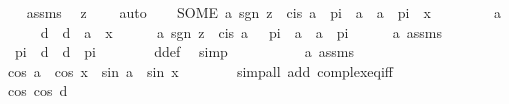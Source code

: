 \begin{isabellebody}
\ \ \isamarkupfalse%
\ assms\ \isamarkupfalse%
\ {\isachardoublequoteopen}z\ {\isasymnoteq}\ {}{\isachardoublequoteclose}\ \isamarkupfalse%
\ auto\isanewline
\ \ \isamarkupfalse%
\ {\isachardoublequoteopen}{\isacharparenleft}{\kern0pt}SOME\ a{\isachardot}{\kern0pt}\ sgn\ z\ {\isacharequal}{\kern0pt}\ cis\ a\ {\isasymand}\ {\isacharminus}{\kern0pt}pi\ {\isacharless}{\kern0pt}\ a\ {\isasymand}\ a\ {\isasymle}\ pi{\isacharparenright}{\kern0pt}\ {\isacharequal}{\kern0pt}\ x{\isachardoublequoteclose}\isanewline
\ \ \isamarkupfalse%
\isanewline
\ \ \ \ \isamarkupfalse%
\ a\isanewline
\ \ \ \ \isamarkupfalse%
\ d\ \ {\isachardoublequoteopen}d\ {\isacharequal}{\kern0pt}\ a\ {\isacharminus}{\kern0pt}\ x{\isachardoublequoteclose}\isanewline
\ \ \ \ \isamarkupfalse%
\ a{\isacharcolon}{\kern0pt}\ {\isachardoublequoteopen}sgn\ z\ {\isacharequal}{\kern0pt}\ cis\ a\ {\isasymand}\ {\isacharminus}{\kern0pt}\ pi\ {\isacharless}{\kern0pt}\ a\ {\isasymand}\ a\ {\isasymle}\ pi{\isachardoublequoteclose}\isanewline
\ \ \ \ \isamarkupfalse%
\ a\ assms\ \isamarkupfalse%
\ {\isachardoublequoteopen}{\isacharminus}{\kern0pt}\ {\isacharparenleft}{\kern0pt}{}{\isacharasterisk}{\kern0pt}pi{\isacharparenright}{\kern0pt}\ {\isacharless}{\kern0pt}\ d\ {\isasymand}\ d\ {\isacharless}{\kern0pt}\ {}{\isacharasterisk}{\kern0pt}pi{\isachardoublequoteclose}\isanewline
\ \ \ \ \ \ \isamarkupfalse%
\ d{\isacharunderscore}{\kern0pt}def\ \isamarkupfalse%
\ simp\isanewline
\ \ \ \ \isamarkupfalse%
\isanewline
\ \ \ \ \isamarkupfalse%
\ a\ assms\ \isamarkupfalse%
\ {\isachardoublequoteopen}cos\ a\ {\isacharequal}{\kern0pt}\ cos\ x{\isachardoublequoteclose}\ \ {\isachardoublequoteopen}sin\ a\ {\isacharequal}{\kern0pt}\ sin\ x{\isachardoublequoteclose}\isanewline
\ \ \ \ \ \ \isamarkupfalse%
\ {\isacharparenleft}{\kern0pt}simp{\isacharunderscore}{\kern0pt}all\ add{\isacharcolon}{\kern0pt}\ complex{\isacharunderscore}{\kern0pt}eq{\isacharunderscore}{\kern0pt}iff{\isacharparenright}{\kern0pt}\isanewline
\ \ \ \ \isamarkupfalse%
\ \isamarkupfalse%
\ cos{\isacharcolon}{\kern0pt}\ {\isachardoublequoteopen}cos\ d\ {\isacharequal}{\kern0pt}\ {}{\isachardoublequoteclose}\isanewline
\ \ \ \ \ \ \isamarkupfalse%

\end{isabellebody}
